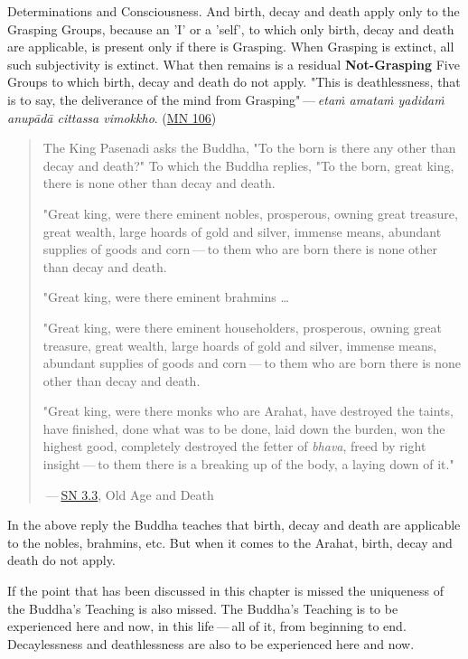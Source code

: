 Determinations and Consciousness. And birth, decay and death apply only to the Grasping Groups, because an 'I' or a 'self', to which only birth, decay and death are applicable, is present only if there is Grasping. When Grasping is extinct, all such subjectivity is extinct. What then remains is a residual \textbf{Not-Grasping} Five Groups to which birth, decay and death do not apply. "This is deathlessness, that is to say, the deliverance of the mind from Grasping" --- \emph{etaṁ amataṁ yadidaṁ anupādā cittassa vimokkho}. (\href{https://suttacentral.net/mn106/en/sujato}{MN 106})

\begin{quote}
The King Pasenadi asks the Buddha, "To the born is there any other than decay and death?" To which the Buddha replies, "To the born, great king, there is none other than decay and death.

"Great king, were there eminent nobles, prosperous, owning great treasure, great wealth, large hoards of gold and silver, immense means, abundant supplies of goods and corn --- to them who are born there is none other than decay and death.

"Great king, were there eminent brahmins \ldots\hspace{0pt}

"Great king, were there eminent householders, prosperous, owning great treasure, great wealth, large hoards of gold and silver, immense means, abundant supplies of goods and corn --- to them who are born there is none other than decay and death.

"Great king, were there monks who are Arahat, have destroyed the taints, have finished, done what was to be done, laid down the burden, won the highest good, completely destroyed the fetter of \emph{bhava}, freed by right insight --- to them there is a breaking up of the body, a laying down of it."

 --- \href{https://suttacentral.net/sn3.3/en/sujato}{SN 3.3}, Old Age and Death
\end{quote}

In the above reply the Buddha teaches that birth, decay and death are applicable to the nobles, brahmins, etc. But when it comes to the Arahat, birth, decay and death do not apply.

If the point that has been discussed in this chapter is missed the uniqueness of the Buddha's Teaching is also missed. The Buddha's Teaching is to be experienced here and now, in this life --- all of it, from beginning to end. Decaylessness and deathlessness are also to be experienced here and now.
